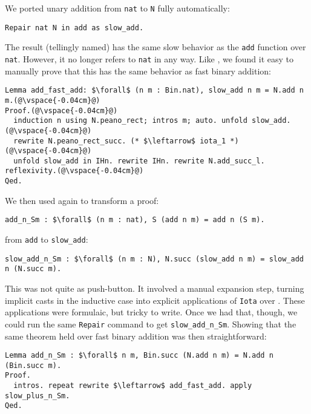 We ported unary addition from \lstinline{nat} to \lstinline{N} fully automatically:

\begin{lstlisting}
Repair nat N in add as slow_add.
\end{lstlisting}
The result (tellingly named) has the same slow behavior as the \lstinline{add} function over \lstinline{nat}.
However, it no longer refers to \lstinline{nat} in any way.
Like \citet{magaud2000changing}, we found it easy to manually prove that
this has the same behavior as fast binary addition:

\begin{lstlisting}
Lemma add_fast_add: $\forall$ (n m : Bin.nat), slow_add n m = N.add n m.(@\vspace{-0.04cm}@)
Proof.(@\vspace{-0.04cm}@)
  induction n using N.peano_rect; intros m; auto. unfold slow_add.(@\vspace{-0.04cm}@)
  rewrite N.peano_rect_succ. (* $\leftarrow$ iota_1 *)(@\vspace{-0.04cm}@)
  unfold slow_add in IHn. rewrite IHn. rewrite N.add_succ_l. reflexivity.(@\vspace{-0.04cm}@)
Qed.
\end{lstlisting}

We then used \toolname again to transform a proof:
\begin{lstlisting}
add_n_Sm : $\forall$ (n m : nat), S (add n m) = add n (S m).
\end{lstlisting}
from \lstinline{add} to \lstinline{slow_add}:

\begin{lstlisting}[backgroundcolor=\color{cyan!30}]
slow_add_n_Sm : $\forall$ (n m : N), N.succ (slow_add n m) = slow_add n (N.succ m).
\end{lstlisting}
This was not quite as push-button.
It involved a manual expansion step, turning implicit casts in the inductive case
into explicit applications of \lstinline{Iota} over \A.
These applications were formulaic, but tricky to write.
Once we had that, though, we could run the same \lstinline{Repair} command
to get \lstinline{slow_add_n_Sm}.
Showing that the same theorem held over fast binary addition was then
straightforward:

\begin{lstlisting}
Lemma add_n_Sm : $\forall$ n m, Bin.succ (N.add n m) = N.add n (Bin.succ m).
Proof.
  intros. repeat rewrite $\leftarrow$ add_fast_add. apply slow_plus_n_Sm.
Qed.
\end{lstlisting}


